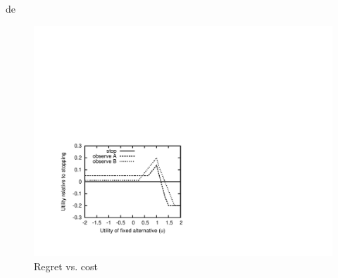 





de

\begin{figure}[htb]
\centering
\includegraphics[scale=0.7, trim=90 70 400 300]{swap-counterex.pdf}
\caption{Regret vs. cost}
\label{fig:swap-counterex}
\end{figure}

